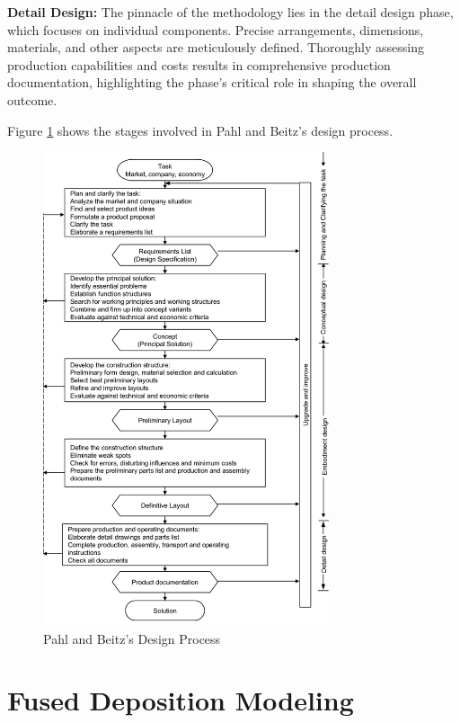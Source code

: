\textbf{Detail Design:} The pinnacle of the methodology lies in the detail design phase, which focuses on individual components. Precise arrangements, dimensions, materials, and other aspects are meticulously defined. Thoroughly assessing production capabilities and costs results in comprehensive production documentation, highlighting the phase's critical role in shaping the overall outcome.

Figure \ref{fig:pahlprocess} shows the stages involved in Pahl and Beitz's design process.

\begin{figure}[ht!]
    \centering
    \includegraphics[width=0.75\textwidth]{texs/Part1/chapter1/image/pahlprocess.png}
    \caption{Pahl and Beitz's Design Process \cite{Pahl07l}}
    \label{fig:pahlprocess}
\end{figure}

\section{Fused Deposition Modeling}
\label{sec:fused_deposition_modeling}

